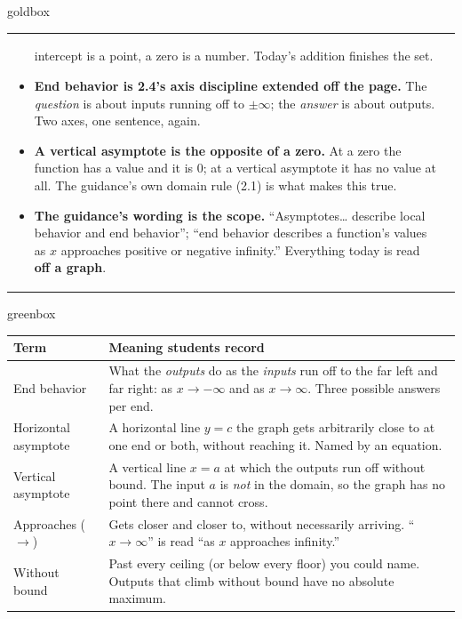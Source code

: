 \documentclass[10pt]{article}
\begin{document}
\begin{skillbox}{goldbox}
\begin{tabularx}{\linewidth}{@{}X|X@{}}
\begin{minipage}[t]{\linewidth}
\begin{itemize}[leftmargin=1.1em, itemsep=2pt, topsep=2pt]
        intercept is a point, a zero is a number. Today's addition finishes the set.
  \item \textbf{End behavior is 2.4's axis discipline extended off the page.} The \emph{question} is
        about inputs running off to $\pm\infty$; the \emph{answer} is about outputs. Two axes, one
        sentence, again.
  \item \textbf{A vertical asymptote is the opposite of a zero.} At a zero the function has a value
        and it is $0$; at a vertical asymptote it has no value at all. The guidance's own domain rule
        (2.1) is what makes this true.
  \item \textbf{The guidance's wording is the scope.} ``Asymptotes\dots{} describe local behavior and
        end behavior''; ``end behavior describes a function's values as $x$ approaches positive or
        negative infinity.'' Everything today is read \textbf{off a graph}.
\end{itemize}
\end{minipage}
\end{tabularx}
\end{skillbox}

\begin{skillbox}{greenbox}
\renewcommand{\arraystretch}{1.35}
\begin{tabularx}{\linewidth}{@{}p{3.6cm}X@{}}
\textbf{Term} & \textbf{Meaning students record} \\
\hline
End behavior & What the \emph{outputs} do as the \emph{inputs} run off to the far left and far right:
    as $x \to -\infty$ and as $x \to \infty$. Three possible answers per end. \\
Horizontal asymptote & A horizontal line $y=c$ the graph gets arbitrarily close to at one end or
    both, without reaching it. Named by an equation. \\
Vertical asymptote & A vertical line $x=a$ at which the outputs run off without bound. The input $a$
    is \emph{not} in the domain, so the graph has no point there and cannot cross. \\
Approaches ($\to$) & Gets closer and closer to, without necessarily arriving. ``$x \to \infty$'' is
    read ``as $x$ approaches infinity.'' \\
Without bound & Past every ceiling (or below every floor) you could name. Outputs that climb without
    bound have no absolute maximum. \\
\end{tabularx}
\end{skillbox}
\end{document}
